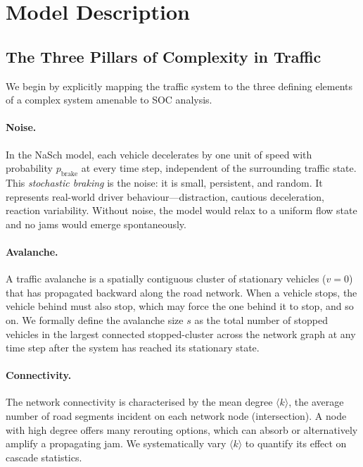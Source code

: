 \documentclass[12pt,a4paper]{article}
\begin{document}
\section{Model Description}
\label{sec:model}

\subsection{The Three Pillars of Complexity in Traffic}
\label{subsec:pillars}

We begin by explicitly mapping the traffic system to the three 
defining elements of a complex system amenable to SOC analysis.

\paragraph{Noise.}
In the NaSch model, each vehicle decelerates by one unit of speed 
with probability $p_\text{brake}$ at every time step, independent of 
the surrounding traffic state. This \emph{stochastic braking} is the 
noise: it is small, persistent, and random. It represents real-world 
driver behaviour—distraction, cautious deceleration, reaction 
variability. Without noise, the model would relax to a uniform flow 
state and no jams would emerge spontaneously.

\paragraph{Avalanche.}
A traffic avalanche is a spatially contiguous cluster of stationary 
vehicles ($v = 0$) that has propagated backward along the road 
network. When a vehicle stops, the vehicle behind must also stop, 
which may force the one behind it to stop, and so on. We formally 
define the avalanche size $s$ as the total number of stopped vehicles 
in the largest connected stopped-cluster across the network graph at 
any time step after the system has reached its stationary state.

\paragraph{Connectivity.}
The network connectivity is characterised by the mean degree 
$\langle k \rangle$, the average number of road segments incident 
on each network node (intersection). A node with high degree offers 
many rerouting options, which can absorb or alternatively amplify a 
propagating jam. We systematically vary $\langle k \rangle$ to 
quantify its effect on cascade statistics.
\end{document}
